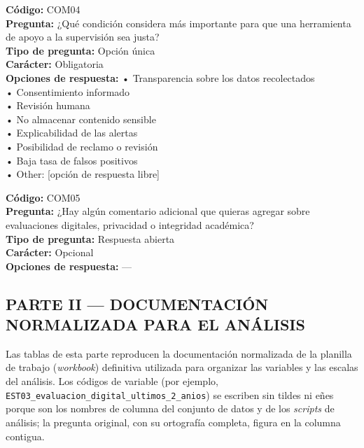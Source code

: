 \begin{infobox}\small
\textbf{\textcolor{accent}{Código:}} COM04\\
\textbf{\textcolor{accent}{Pregunta:}} ¿Qué condición considera más importante para que una herramienta de apoyo a la supervisión sea justa?\\
\textbf{\textcolor{accent}{Tipo de pregunta:}} Opción única\\
\textbf{\textcolor{accent}{Carácter:}} Obligatoria\\
\textbf{\textcolor{accent}{Opciones de respuesta:}} • Transparencia sobre los datos recolectados \\ • Consentimiento informado \\ • Revisión humana \\ • No almacenar contenido sensible \\ • Explicabilidad de las alertas \\ • Posibilidad de reclamo o revisión \\ • Baja tasa de falsos positivos \\ • Other: [opción de respuesta libre]\\
\end{infobox}
\begin{infobox}\small
\textbf{\textcolor{accent}{Código:}} COM05\\
\textbf{\textcolor{accent}{Pregunta:}} ¿Hay algún comentario adicional que quieras agregar sobre evaluaciones digitales, privacidad o integridad académica?\\
\textbf{\textcolor{accent}{Tipo de pregunta:}} Respuesta abierta\\
\textbf{\textcolor{accent}{Carácter:}} Opcional\\
\textbf{\textcolor{accent}{Opciones de respuesta:}} ---\\
\end{infobox}
\subsection*{PARTE II --- DOCUMENTACIÓN NORMALIZADA PARA EL ANÁLISIS}
Las tablas de esta parte reproducen la documentación normalizada de la planilla de trabajo (\textit{workbook}) definitiva utilizada para organizar las variables y las escalas del análisis. Los códigos de variable (por ejemplo, \texttt{EST03\_evaluacion\_digital\_ultimos\_2\_anios}) se escriben sin tildes ni eñes porque son los nombres de columna del conjunto de datos y de los \textit{scripts} de análisis; la pregunta original, con su ortografía completa, figura en la columna contigua.


